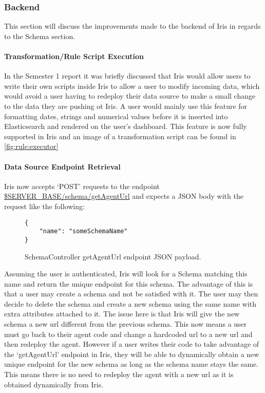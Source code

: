 \documentclass[12pt,a4paper,titlepage]{report}
\begin{document}
\subsubsection{Backend}
This section will discuss the improvements made to the backend of Iris in regards to the Schema section.

\paragraph{Transformation/Rule Script Execution}
\label{para:rule:executor:backend}
In the Semester 1 report it was briefly discussed that Iris would allow users to write their own scripts inside Iris to allow a user to modify incoming data, which would avoid a user having to redeploy their data source to make a small change to the data they are pushing ot Iris. A user would mainly use this feature for formatting dates, strings and numerical values before it is inserted into Elasticsearch and rendered on the user's dashboard. This feature is now fully supported in Iris and an image of a transformation script can be found in \cref{fig:rule:executor}

\paragraph{Data Source Endpoint Retrieval}
Iris now accepts `POST' requests to the endpoint \url{$SERVER_BASE/schema/getAgentUrl} and expects a JSON body with the request like the following:

\begin{figure}[H]
\begin{tcolorbox}
\begin{verbatim}
{
    "name": "someSchemaName"
}
\end{verbatim}
\end{tcolorbox}
\caption{SchemaController getAgentUrl endpoint JSON payload.}
\end{figure}
Assuming the user is authenticated, Iris will look for a Schema matching this name and return the unique endpoint for this schema. The advantage of this is that a user may create a schema and not be satisfied with it. The user may then decide to delete the schema and create a new schema using the same name with extra attributes attached to it. The issue here is that Iris will give the new schema a new url different from the previous schema. This now means a user must go back to their agent code and change a hardcoded url to a new url and then redeploy the agent. However if a user writes their code to take advantage of the `getAgentUrl' endpoint in Iris, they will be able to dynamically obtain a new unique endpoint for the new schema as long as the schema name stays the same. This means there is no need to redeploy the agent with a new url as it is obtained dynamically from Iris.
\end{document}

